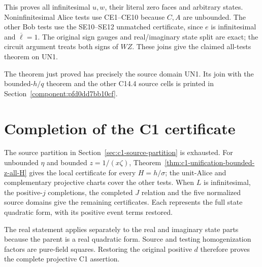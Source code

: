 This proves all infinitesimal $u,w$, their literal zero faces and
arbitrary states. Noninfinitesimal Alice tests use CE1--CE10 because
$C,A$ are unbounded. The other Bob tests use the SE10--SE12
unmatched certificate, since $e$ is infinitesimal and
$\overline\ell=1$. The original sign gauges and real/imaginary state
split are exact; the circuit argument treats both signs of $WZ$.
These joins give the claimed all-tests theorem on UN1.

The theorem just proved has precisely the source domain UN1. Its join with the bounded-$h/q$ theorem and the other C14.4 source cells is printed in Section~\ref{component:pfd0dd7bb10cf}.



\section{Completion of the C1 certificate}
The source partition in Section~\ref{sec:c1-source-partition} is
exhausted. For unbounded $\eta$ and bounded $z=1/(x\zeta)$,
Theorem~\ref{thm:c1-unification-bounded-z-all-H} gives the local
certificate for every $H=h/\sigma$; the unit-Alice and complementary
projective charts cover the other tests. When $L$ is infinitesimal,
the positive-$j$ completions, the completed $J$ relation and the five
normalized source domains give the remaining certificates. Each
represents the full state quadratic form, with its positive event
terms restored.

The real statement applies separately to the real and imaginary state
parts because the parent is a real quadratic form. Source and testing
homogenization factors are pure-field squares. Restoring the original
positive $d$ therefore proves the complete projective C1 assertion.
